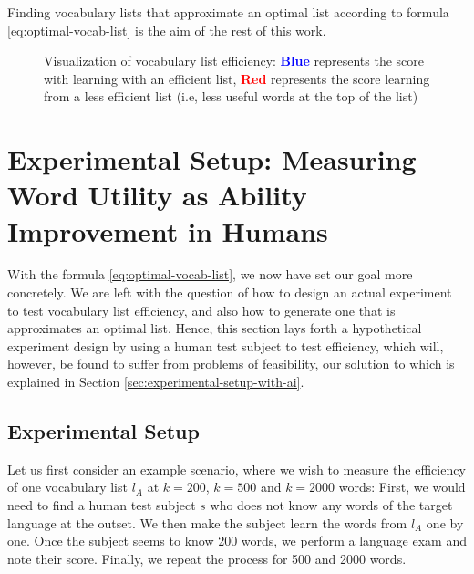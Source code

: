 Finding vocabulary lists that approximate an optimal list according to formula \ref{eq:optimal-vocab-list} is the aim of the rest of this work.

\begin{figure}[H]
	\centering
	\caption{Visualization of vocabulary list efficiency: \textbf{\textcolor{blue}{Blue}} represents the score with learning with an efficient list, \textbf{\textcolor{red}{Red}} represents the score learning from a less efficient list (i.e, less useful words at the top of the list)}
	\label{fig:voc-list-efficiency}
\end{figure}

\section{Experimental Setup: Measuring Word Utility as Ability Improvement in Humans} \label{sec:human-efficiency-testing}
With the formula \ref{eq:optimal-vocab-list}, we now have set our goal more concretely.
We are left with the question of how to design an actual experiment to test vocabulary list efficiency, and also how to generate one that is approximates an optimal list.
Hence, this section lays forth a hypothetical experiment design by using a human test subject to test efficiency, which will, however, be found to suffer from problems of feasibility, our solution to which is explained in Section \ref{sec:experimental-setup-with-ai}.

\subsection{Experimental Setup}
Let us first consider an example scenario, where we wish to measure the efficiency of one vocabulary list $l_A$ at $k=200$, $k=500$ and $k=2000$ words:
First, we would need to find a human test subject $s$ who does not know any words of the target language at the outset.
We then make the subject learn the words from $l_A$ one by one.
Once the subject seems to know 200 words, we perform a language exam and note their score.
Finally, we repeat the process for 500 and 2000 words.

